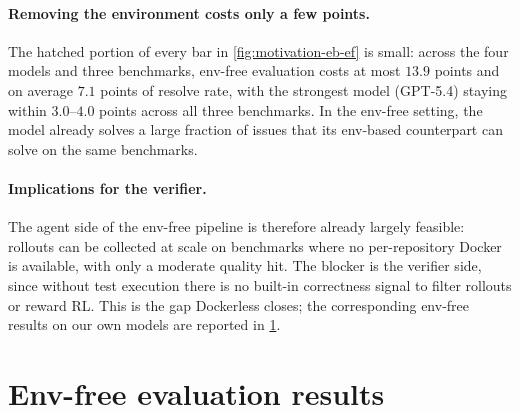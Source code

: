 \documentclass{llmxive}
\providecommand{\approach}{Dockerless\xspace}
\begin{document}
\paragraph{Removing the environment costs only a few points.}
The hatched portion of every bar in \cref{fig:motivation-eb-ef} is small: across the four models and three benchmarks, env-free evaluation costs at most $13.9$ points and on average $7.1$ points of resolve rate, with the strongest model (GPT-5.4) staying within $3.0$--$4.0$ points across all three benchmarks.
In the env-free setting, the model already solves a large fraction of issues that its env-based counterpart can solve on the same benchmarks.


\paragraph{Implications for the verifier.}
The agent side of the env-free pipeline is therefore already largely feasible: rollouts can be collected at scale on benchmarks where no per-repository Docker is available, with only a moderate quality hit.
The blocker is the verifier side, since without test execution there is no built-in correctness signal to filter rollouts or reward RL.
This is the gap \approach closes; the corresponding env-free results on our own models are reported in \cref{app:wo-env-eval}.


\section{Env-free evaluation results}
\label{app:wo-env-eval}
\end{document}
